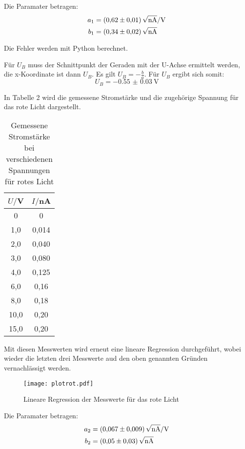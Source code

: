 Die Paramater betragen:
\begin{align*}
  a_1 &= \SI{0.62(1)}{\sqrt{\nano\ampere}\per\volt} \\
  b_1 &= \SI{0.34(2)}{\sqrt{\nano\ampere}}
\end{align*}

Die Fehler werden mit Python berechnet.

Für $U_B$ muss der Schnittpunkt der Geraden mit der U-Achse ermittelt werden, die x-Koordinate ist dann $U_B$.
Es gilt $U_B = -\frac{b}{a}$. Für $U_B$ ergibt sich somit:
\begin{equation*}
  U_B = \SI{-0.55(3)}{\volt}
\end{equation*}


In Tabelle 2 wird die gemessene Stromstärke und die zugehörige Spannung für das rote Licht dargestellt.

\begin{table}[H]
  \centering
  \caption{Gemessene Stromstärke bei verschiedenen Spannungen für rotes Licht}
  \label{tab:Spannungsamplitude}
  \begin{tabular}{c c}
    \toprule
    $U/$V & $I/$nA \\
    \midrule
     0 & 0 \\
     1,0 & 0,014 \\
     2,0 & 0,040 \\
     3,0 & 0,080 \\
     4,0 & 0,125 \\
     6,0 & 0,16 \\
     8,0 & 0,18 \\
    10,0 & 0,20 \\
    15,0 & 0,20 \\
    \bottomrule
  \end{tabular}
\end{table}

Mit diesen Messwerten wird erneut eine lineare Regression durchgeführt, wobei wieder die letzten drei Messwerte
aud den oben genannten Gründen vernachlässigt werden.

\begin{figure}[H]
  \centering
  \texttt{[image: plotrot.pdf]}
  \caption{Lineare Regression der Messwerte für das rote Licht}
  \label{fig:plot}
\end{figure}

Die Paramater betragen:
\begin{align*}
  a_2 &= \SI{0.067(9)}{\sqrt{\nano\ampere}\per\volt} \\
  b_2 &= \SI{0.05(3)}{\sqrt{\nano\ampere}}
\end{align*}

